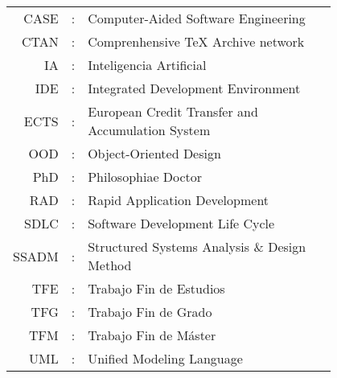 \begin{tabular}{r r p{0.8\linewidth}}
CASE& : &Computer-Aided Software Engineering \\
CTAN& : &Comprenhensive \TeX{} Archive network \\
IA& : & Inteligencia Artificial \\
IDE& : &Integrated Development Environment \\
ECTS& : &European Credit Transfer and Accumulation System \\
OOD& : &Object-Oriented Design \\
PhD& : &Philosophiae Doctor \\
RAD& : &Rapid Application Development \\
SDLC& : &Software Development Life Cycle \\
SSADM& : &Structured Systems Analysis \& Design Method \\
TFE& : &Trabajo Fin de Estudios \\
TFG& : &Trabajo Fin de Grado \\
TFM& : &Trabajo Fin de Máster \\
UML& : &Unified Modeling Language
\end{tabular}


\idxGral
\idxFiguras
\idxTablas
\idxListados
\idxAlgoritmos


